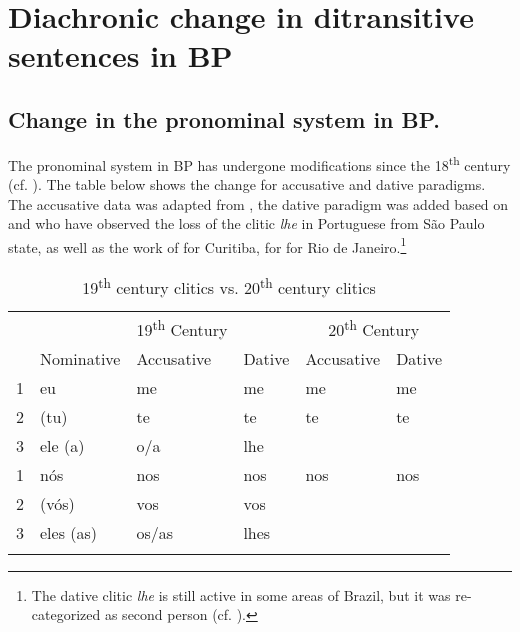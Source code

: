 \documentclass[output=paper,colorlinks,citecolor=brown,modfonts,nonflat]{langsci/langscibook}
\begin{document}
\section{Diachronic change in ditransitive sentences in BP}\label{sec:calindro:2}
\subsection{Change in the pronominal system in BP.}
\label{sec:calindro:2.1}
The pronominal system in BP has undergone modifications since the 18\textsuperscript{th} century (cf. \citealt{KatoCyrinoCorrêa2009}). The table below shows the change for accusative and dative paradigms. The accusative data was adapted from \citet[246]{KatoCyrinoCorrêa2009}, the dative paradigm was added based on \citet{Calindro2015} and \citet{TorresMoraisBerlinck2006} who have observed the loss of the clitic \textit{lhe} in Portuguese from São Paulo state, as well as the work of \citet{Berlinck1997} for Curitiba, \citet{Silveira1999} for \citet{Freire2005} for Rio de Janeiro.\footnote{The dative clitic \textit{lhe} is still active in some areas of Brazil, but it was re-categorized as second person (cf. \citealt{FigueiredoSilva2007}).}

\begin{table}
\caption{19\textsuperscript{th} century clitics vs. 20\textsuperscript{th} century clitics}
\label{tab:calindro:1}
\begin{tabularx}{\textwidth}{X llX ll}
\lsptoprule
&  &{ 19\textsuperscript{th} Century} & & \multicolumn{2}{c}{{ 20\textsuperscript{th} Century}}\\
\cmidrule(lr{.1em}){2-4}\cmidrule(lr{.1em}){5-6}
& {{Nominative}} & {{Accusative}} & {{Dative}} & {{Accusative}} & {{Dative}}\\
\midrule
{1}  & eu & me & me & me & me\\
{2}  & (tu) & te & te & te & te\\
{3}  & ele (a) & o/a & lhe & {\longrule} & {\longrule}\\
  \tablevspace
{1}  & nós & nos & nos & nos & nos\\
{2} & (vós) & vos & vos & {\longrule} & {\longrule}\\
{3}  & eles (as) & os/as & lhes & {\longrule} & {\longrule}\\
\lspbottomrule
\end{tabularx}
\end{table}
\end{document}
